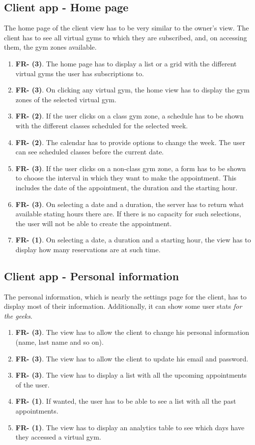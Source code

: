 \documentclass[a4paper, 12pt, oneside]{book}
\begin{document}
\subsection{Client app - Home page}
The home page of the client view has to be very similar to the owner's view. The client has to see all virtual gyms to which they are subscribed, and, on accessing them, the gym zones available.
\begin{enumerate}[label = -]
	\item \textbf{FR- (3)}. The home page has to display a list or a grid with the different virtual gyms the user has subscriptions to.
	\item \textbf{FR- (3)}. On clicking any virtual gym, the home view has to display the gym zones of the selected virtual gym.
	\item \textbf{FR- (2)}. If the user clicks on a class gym zone, a schedule has to be shown with the different classes scheduled for the selected week.
	\item \textbf{FR- (2)}. The calendar has to provide options to change the week. The user can see scheduled classes before the current date.
	\item \textbf{FR- (3)}. If the user clicks on a non-class gym zone, a form has to be shown to choose the interval in which they want to make the appointment. This includes the date of the appointment, the duration and the starting hour.
	\item \textbf{FR- (3)}. On selecting a date and a duration, the server has to return what available stating hours there are. If there is no capacity for such selections, the user will not be able to create the appointment.
	\item \textbf{FR- (1)}. On selecting a date, a duration and a starting hour, the view has to display how many reservations are at such time.
\end{enumerate}
\subsection{Client app - Personal information}
The personal information, which is nearly the settings page for the client, has to display most of their information. Additionally, it can show some user stats \emph{for the geeks}.
\begin{enumerate}[label = -]
	\item \textbf{FR- (3)}. The view has to allow the client to change his personal information (name, last name and so on).
	\item \textbf{FR- (3)}. The view has to allow the client to update his email and password.
	\item \textbf{FR- (3)}. The view has to display a list with all the upcoming appointments of the user.
	\item \textbf{FR- (1)}. If wanted, the user has to be able to see a list with all the past appointments.
	\item \textbf{FR- (1)}. The view has to display an analytics table to see which days have they accessed a virtual gym.
\end{enumerate}
\end{document}
